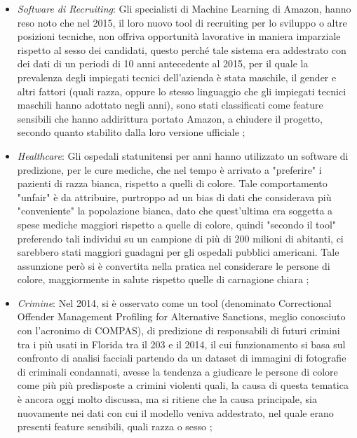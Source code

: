 \begin{itemize}
    \item \emph{Software di Recruiting}: Gli specialisti di Machine Learning di Amazon, hanno reso noto che nel 2015, il loro nuovo tool di recruiting per lo sviluppo o altre posizioni tecniche, non offriva opportunità lavorative in maniera imparziale rispetto al sesso dei candidati, questo perché tale sistema era addestrato con dei dati di un periodi di 10 anni antecedente al 2015, per il quale la prevalenza degli impiegati tecnici dell'azienda è stata maschile, il gender e altri fattori (quali razza, oppure lo stesso linguaggio che gli impiegati tecnici maschili hanno adottato negli anni), sono stati classificati come feature sensibili che hanno addirittura portato Amazon, a chiudere il progetto, secondo quanto stabilito dalla loro versione ufficiale \cite{amazonrecruiting2018reuters};
    
    
    \item \emph{Healthcare}: Gli ospedali statunitensi per anni hanno utilizzato un software di predizione, per le cure mediche, che nel tempo è arrivato a "preferire" i pazienti di razza bianca, rispetto a quelli di colore. Tale comportamento "unfair" è da attribuire, purtroppo ad un bias di dati che considerava più "conveniente" la popolazione bianca, dato che quest'ultima era soggetta a spese mediche maggiori rispetto a quelle di colore, quindi "secondo il tool" preferendo tali individui su un campione di più di 200 milioni di abitanti, ci sarebbero stati maggiori guadagni per gli ospedali pubblici americani. Tale assunzione però si è convertita nella pratica nel considerare le persone di colore, maggiormente in salute rispetto quelle di carnagione chiara \cite{HealtCareBias};
    
    \item \emph{Crimine}: Nel 2014, si è osservato come un tool  (denominato Correctional Offender Management Profiling for Alternative Sanctions, meglio conosciuto con l'acronimo di COMPAS), di predizione di responsabili di futuri crimini tra i più usati in Florida tra il 203 e il 2014, il cui funzionamento si basa sul confronto di analisi facciali partendo da  un dataset di immagini di fotografie di criminali condannati, avesse la tendenza a giudicare le persone di colore come più più predisposte a crimini violenti quali, la causa di questa tematica è ancora oggi molto discussa, ma si ritiene che la causa principale, sia nuovamente nei dati con cui il modello veniva addestrato, nel quale erano presenti feature sensibili, quali razza o sesso \cite{biasblack2016propublica};
    

\end{itemize}
